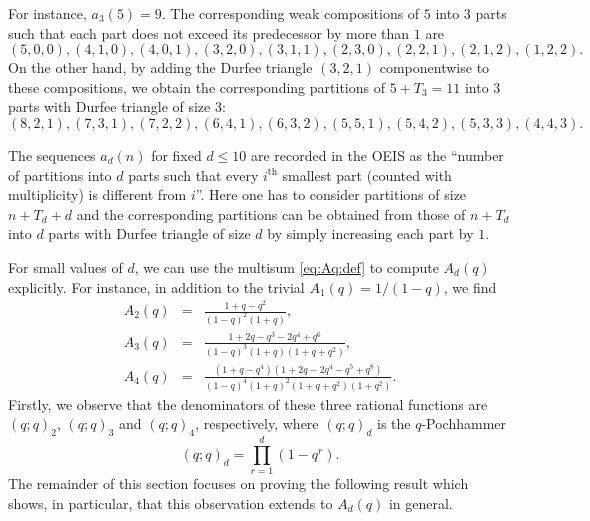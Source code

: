 \documentclass[11pt]{article}
\theoremstyle{plain}
\theoremstyle{definition}
\begin{document}
\begin{example}
  For instance, $a_3 (5) = 9$. The corresponding weak compositions of $5$ into
  $3$ parts such that each part does not exceed its predecessor by more than
  $1$ are
  \begin{equation*}
    (5, 0, 0), (4, 1, 0), (4, 0, 1), (3, 2, 0), (3, 1, 1), (2, 3, 0), (2, 2,
     1), (2, 1, 2), (1, 2, 2) .
  \end{equation*}
  On the other hand, by adding the Durfee triangle $(3, 2, 1)$ componentwise
  to these compositions, we obtain the corresponding partitions of $5 + T_3 =
  11$ into $3$ parts with Durfee triangle of size $3$:
  \begin{equation*}
    (8, 2, 1), (7, 3, 1), (7, 2, 2), (6, 4, 1), (6, 3, 2), (5, 5, 1), (5, 4,
     2), (5, 3, 3), (4, 4, 3) .
  \end{equation*}
\end{example}

\begin{remark}
  The sequences $a_d (n)$ for fixed $d \leq 10$ are recorded in the OEIS
  \cite{sloane-oeis} as the ``number of partitions into $d$ parts such that
  every $i^{\text{th}}$ smallest part (counted with multiplicity) is different
  from $i$''. Here one has to consider partitions of size $n + T_d + d$ and
  the corresponding partitions can be obtained from those of $n + T_d$ into
  $d$ parts with Durfee triangle of size $d$ by simply increasing each part by
  $1$.
\end{remark}

For small values of $d$, we can use the multisum \eqref{eq:Aq:def} to compute
$A_d (q)$ explicitly. For instance, in addition to the trivial $A_1 (q) = 1 /
(1 - q)$, we find
\begin{eqnarray*}
  A_2 (q) & = & \frac{1 + q - q^2}{(1 - q)^2 (1 + q)},\\
  A_3 (q) & = & \frac{1 + 2 q - q^3 - 2 q^4 + q^6}{(1 - q)^3 (1 + q) (1 + q +
  q^2)},\\
  A_4 (q) & = & \frac{(1 + q - q^4) (1 + 2 q - 2 q^4 - q^5 + q^8)}{(1 - q)^4
  (1 + q)^2 (1 + q + q^2) (1 + q^2)} .
\end{eqnarray*}
Firstly, we observe that the denominators of these three rational functions
are $(q ; q)_2$, $(q ; q)_3$ and $(q ; q)_4$, respectively, where $(q ; q)_d$
is the $q$-Pochhammer
\begin{equation}
  (q ; q)_d = \prod_{r = 1}^d (1 - q^r) . \label{eq:qpochhammer}
\end{equation}
The remainder of this section focuses on proving the following result which
shows, in particular, that this observation extends to $A_d (q)$ in general.
\end{document}

